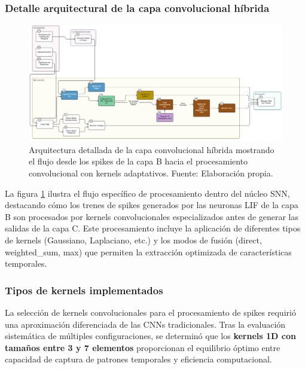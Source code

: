 \subsubsection{Detalle arquitectural de la capa convolucional híbrida}

\begin{figure}[!htb]
    \centering
    \includegraphics[width=1.0\textwidth]{Imagenes/Arquitectura detallada SNN.png}
    \caption{Arquitectura detallada de la capa convolucional híbrida mostrando el flujo desde los spikes de la capa B hacia el procesamiento convolucional con kernels adaptativos. Fuente: Elaboración propia.}
    \label{fig:Arquitectura detallada SNN}
\end{figure}

La figura \ref{fig:Arquitectura detallada SNN} ilustra el flujo específico de procesamiento dentro del núcleo SNN, destacando cómo los trenes de spikes generados por las neuronas LIF de la capa B son procesados por kernels convolucionales especializados antes de generar las salidas de la capa C. Este procesamiento incluye la aplicación de diferentes tipos de kernels (Gaussiano, Laplaciano, etc.) y los modos de fusión (direct, weighted\_sum, max) que permiten la extracción optimizada de características temporales.


\subsubsection {Tipos de kernels implementados}

La selección de kernels convolucionales para el procesamiento de spikes requirió una aproximación diferenciada de las CNNs tradicionales. Tras la evaluación sistemática de múltiples configuraciones, se determinó que los \textbf{kernels 1D con tamaños entre 3 y 7 elementos} proporcionan el equilibrio óptimo entre capacidad de captura de patrones temporales y eficiencia computacional.

